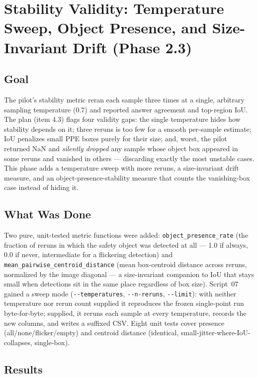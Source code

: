 \chapter{Stability Validity: Temperature Sweep, Object Presence, and Size-Invariant Drift (Phase 2.3)}
\label{chap:p2-3}

\section{Goal}

The pilot's stability metric reran each sample three times at a single, arbitrary sampling temperature
(0.7) and reported answer agreement and top-region IoU. The plan (item 4.3) flags four validity gaps:
the single temperature hides how stability depends on it; three reruns is too few for a smooth
per-sample estimate; IoU penalizes small PPE boxes purely for their size; and, worst, the pilot
returned NaN and \emph{silently dropped} any sample whose object box appeared in some reruns and
vanished in others --- discarding exactly the most unstable cases. This phase adds a temperature sweep
with more reruns, a size-invariant drift measure, and an object-presence-stability measure that counts
the vanishing-box case instead of hiding it.

\section{What Was Done}

Two pure, unit-tested metric functions were added: \texttt{object\_presence\_rate} (the fraction of
reruns in which the safety object was detected at all --- 1.0 if always, 0.0 if never, intermediate for
a flickering detection) and \texttt{mean\_pairwise\_centroid\_distance} (mean box-centroid distance
across reruns, normalized by the image diagonal --- a size-invariant companion to IoU that stays small
when detections sit in the same place regardless of box size). Script~07 gained a sweep mode
(\texttt{-{}-temperatures}, \texttt{-{}-n-reruns}, \texttt{-{}-limit}): with neither temperature nor
rerun count supplied it reproduces the frozen single-point run byte-for-byte; supplied, it reruns each
sample at every temperature, records the new columns, and writes a suffixed CSV. Eight unit tests cover
presence (all/none/flicker/empty) and centroid distance (identical, small-jitter-where-IoU-collapses,
single-box).

\section{Results}


